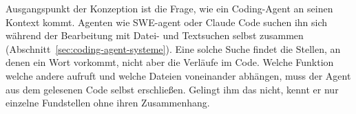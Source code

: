 
Ausgangspunkt der Konzeption ist die Frage, wie ein Coding-Agent an seinen Kontext kommt. Agenten wie SWE-agent oder Claude Code suchen ihn sich während der Bearbeitung mit Datei- und Textsuchen selbst zusammen~\parencite{yang2024sweagent,li2026contextbench} (Abschnitt~\ref{sec:coding-agent-systeme}). Eine solche Suche findet die Stellen, an denen ein Wort vorkommt, nicht aber die Verläufe im Code. Welche Funktion welche andere aufruft und welche Dateien voneinander abhängen, muss der Agent aus dem gelesenen Code selbst erschließen. Gelingt ihm das nicht, kennt er nur einzelne Fundstellen ohne ihren Zusammenhang.

